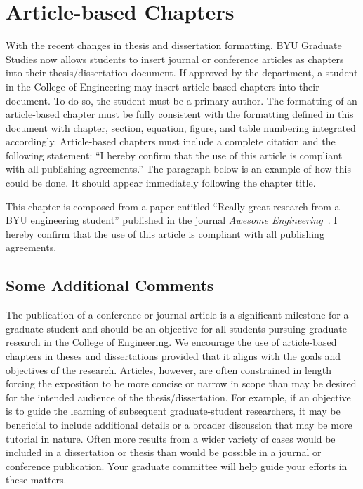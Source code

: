 \chapter{Article-based Chapters}
\label{ch:article_based_chap}

With the recent changes in thesis and dissertation formatting, BYU Graduate Studies now allows students to insert journal or conference articles as chapters into their thesis/dissertation document. If approved by the department, a student in the College of Engineering may insert article-based chapters into their document. To do so, the student must be a primary author. The formatting of an article-based chapter must be fully consistent with the formatting defined in this document with chapter, section, equation, figure, and table numbering integrated accordingly. Article-based chapters must include a complete citation and the following statement: ``I hereby confirm that the use of this article is compliant with all publishing agreements.'' The paragraph below is an example of how this could be done. It should appear immediately following the chapter title.

\vspace{0.1in}
\noindent This chapter is composed from a paper entitled ``Really great research from a BYU engineering student'' published in the journal {\itshape Awesome Engineering}~. I hereby confirm that the use of this article is compliant with all publishing agreements.



\section{Some Additional Comments}
The publication of a conference or journal article is a significant milestone for a graduate  student and should be an objective for all students pursuing graduate research in the College of Engineering. We encourage the use of article-based chapters in theses and dissertations provided that it aligns with the goals and objectives of the research. Articles, however, are often constrained in length forcing the exposition to be more concise or narrow in scope than may be desired for the intended audience of the thesis/dissertation. For example, if an objective is to guide the learning of subsequent graduate-student researchers, it may be beneficial to include additional details or a broader discussion that may be more tutorial in nature. Often more results from a wider variety of cases would be included in a dissertation or thesis than would be possible in a journal or conference publication. Your graduate committee will help guide your efforts in these matters.

